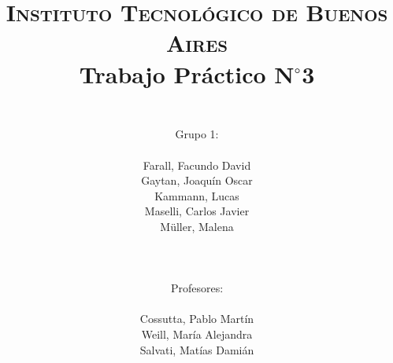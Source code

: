 




	\title{
		\normalfont \normalsize \textsc{Instituto Tecnol\'ogico de Buenos Aires} \\ [25pt]
		\huge Trabajo Pr\'actico N$^{\circ}$3 \\
		\author{
			\\Grupo 1:\\\\Farall, Facundo David\\Gaytan, Joaqu\'in Oscar\\Kammann, Lucas\\Maselli, Carlos Javier\\M\"uller, Malena \\ \\ \\ \\
			Profesores: \\\\ Cossutta, Pablo Mart\'in\\Weill, Mar\'ia Alejandra\\Salvati, Mat\'ias Dami\'an \\ \\ \\ 
		} 		
	}
	\maketitle
	\newpage

	\tableofcontents

	\newpage
	
	\newpage
	
	\newpage
	
	\newpage
	
	\newpage
	
	\newpage
	


